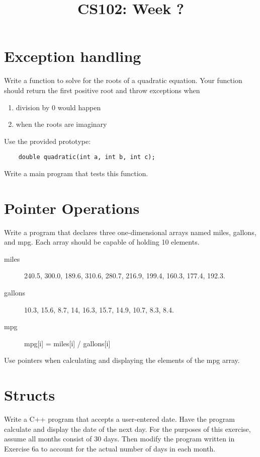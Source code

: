\documentclass{article}
\begin{document}
\title{CS102: Week ?}
\maketitle 

\section*{Exception handling}
Write a function to solve for the roots of a quadratic equation. Your function should return the first positive root and throw exceptions when 
\begin{enumerate}
	\item division by 0 would happen
	\item when the roots are imaginary
\end{enumerate}
 Use the provided prototype:
\begin{lstlisting}
	double quadratic(int a, int b, int c);
\end{lstlisting}
Write a main program that tests this function. 

\section*{Pointer Operations}
Write a program that declares three one-dimensional arrays named miles, gallons, and mpg. Each array should be capable of holding 10 elements.
\begin{description}
\item[miles] 240.5, 300.0, 189.6, 310.6, 280.7, 216.9, 199.4, 160.3, 177.4, 192.3. 
\item[gallons] 10.3, 15.6, 8.7, 14, 16.3, 15.7, 14.9, 10.7, 8.3,  8.4. 
\item[mpg] mpg[i] = miles[i] / gallons[i]
\end{description}
Use pointers when calculating and displaying the elements of the mpg array.

\section*{Structs}
Write a C++ program that accepts a user-entered date. Have the program calculate and display the date of the next day. For the purposes of this exercise, assume all months consist of 30 days. Then modify the program written in Exercise 6a to account for the actual number of days in each month.
\end{document}

